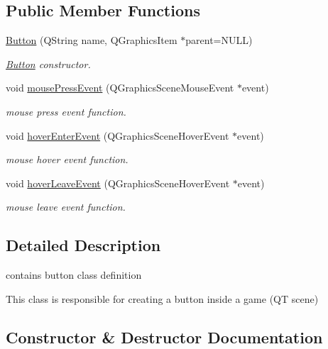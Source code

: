 \subsection*{Public Member Functions}
\begin{DoxyCompactItemize}
\item 
\hyperlink{classButton_a69976e5c00874a3807b642f249c1c776}{Button} (Q\+String name, Q\+Graphics\+Item $\ast$parent=N\+U\+LL)
\begin{DoxyCompactList}\small\item\em \hyperlink{classButton}{Button} constructor. \end{DoxyCompactList}\item 
void \hyperlink{classButton_a17d8eb0c904605b223bbc00c75655315}{mouse\+Press\+Event} (Q\+Graphics\+Scene\+Mouse\+Event $\ast$event)
\begin{DoxyCompactList}\small\item\em mouse press event function. \end{DoxyCompactList}\item 
void \hyperlink{classButton_a633a9684818bc5d300a622a00064f09c}{hover\+Enter\+Event} (Q\+Graphics\+Scene\+Hover\+Event $\ast$event)
\begin{DoxyCompactList}\small\item\em mouse hover event function. \end{DoxyCompactList}\item 
void \hyperlink{classButton_a1689a97690d9469ce8350d24db0d7485}{hover\+Leave\+Event} (Q\+Graphics\+Scene\+Hover\+Event $\ast$event)
\begin{DoxyCompactList}\small\item\em mouse leave event function. \end{DoxyCompactList}\end{DoxyCompactItemize}


\subsection{Detailed Description}
contains button class definition 

This class is responsible for creating a button inside a game (QT scene) 

\subsection{Constructor \& Destructor Documentation}
\mbox{\label{classButton_a69976e5c00874a3807b642f249c1c776}} 
